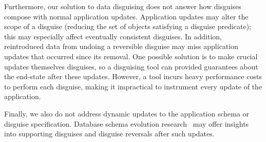 %
Furthermore, our solution to data disguising does not answer how disguises compose with normal
application updates. 
%
Application updates may alter the scope of a disguise (\ie reducing the set of
objects satisfying a disguise predicate); this may especially affect eventually
consistent disguises. 
%
In addition, reintroduced data from undoing a reversible disguise may miss application updates that
occurred since its removal. One possible solution is to make crucial updates themselves disguises,
so a disguising tool can provided guarantees about the end-state after these updates.
However, a tool incurs heavy performance costs to perform each disguise, making it
impractical to instrument every update of the application.

Finally, we also do not address dynamic updates to the application schema or disguise specification.
%
Database schema evolution research~\cite{schema:evo} may offer insights
into supporting disguises and disguise reversals after such updates.


